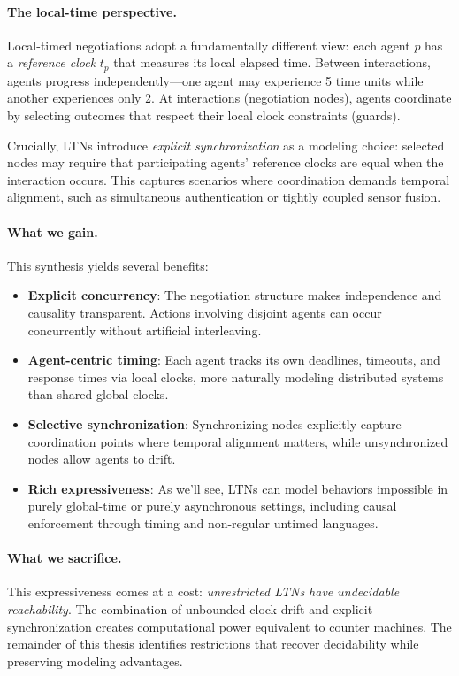 \paragraph{The local-time perspective.} Local-timed negotiations adopt a fundamentally different view: each agent $p$ has a \emph{reference clock} $t_p$ that measures its local elapsed time. Between interactions, agents progress independently—one agent may experience 5 time units while another experiences only 2. At interactions (negotiation nodes), agents coordinate by selecting outcomes that respect their local clock constraints (guards). 

Crucially, LTNs introduce \emph{explicit synchronization} as a modeling choice:
selected nodes may require that participating agents’ reference clocks are equal
when the interaction occurs.  This captures scenarios where coordination demands
temporal alignment, such as simultaneous authentication or tightly coupled sensor
fusion.

\paragraph{What we gain.} This synthesis yields several benefits:

\begin{itemize}
\item \textbf{Explicit concurrency}: The negotiation structure makes independence and causality transparent. Actions involving disjoint agents can occur concurrently without artificial interleaving.

\item \textbf{Agent-centric timing}: Each agent tracks its own deadlines, timeouts, and response times via local clocks, more naturally modeling distributed systems than shared global clocks.

\item \textbf{Selective synchronization}: Synchronizing nodes explicitly capture coordination points where temporal alignment matters, while unsynchronized nodes allow agents to drift.

\item \textbf{Rich expressiveness}: As we'll see, LTNs can model behaviors impossible in purely global-time or purely asynchronous settings, including causal enforcement through timing and non-regular untimed languages.
\end{itemize}

\paragraph{What we sacrifice.} This expressiveness comes at a cost: \emph{unrestricted LTNs have undecidable reachability}. The combination of unbounded clock drift and explicit synchronization creates computational power equivalent to counter machines. The remainder of this thesis identifies restrictions that recover decidability while preserving modeling advantages.

